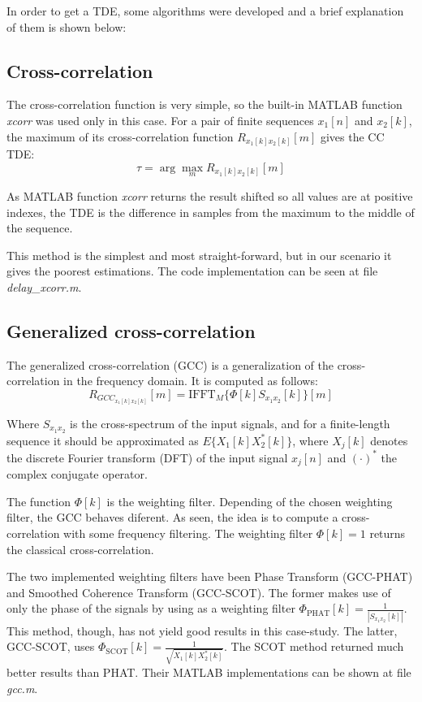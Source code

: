 In order to get a TDE, some algorithms were developed and a brief explanation of them is shown below:

\subsection{Cross-correlation}
  The cross-correlation function is very simple, so the built-in MATLAB function \emph{xcorr} was used only in this case. For a pair of finite sequences $x_1[n]$ and $x_2[k]$, the maximum of its cross-correlation function $R_{x_1[k] x_2[k]}[m]$ gives the CC TDE:
  $$ \tau = \arg\max_m R_{x_1[k] x_2[k]}[m] $$
  
  As MATLAB function \emph{xcorr} returns the result shifted so all values are at positive indexes, the TDE is the difference in samples from the maximum to the middle of the sequence.
  
  This method is the simplest and most straight-forward, but in our scenario it gives the poorest estimations. The code implementation can be seen at file \emph{delay\_xcorr.m}\cite{delayxcorr}.
  

\subsection{Generalized cross-correlation}
The generalized cross-correlation (GCC) is a generalization of the cross-correlation in the frequency domain. It is computed as follows:
$$R_{GCC_{x_1[k] x_2[k]}}[m] = \text{IFFT}_M\{\Phi[k]S_{x_1x_2}[k]\}[m]$$

Where $S_{x_1x_2}$ is the cross-spectrum of the input signals, and for a finite-length sequence it should be approximated as $E\{X_1[k]X^*_2[k]\} $, where $X_j[k]$ denotes the discrete Fourier transform (DFT) of the input signal $x_j[n]$ and $(\cdotp)^*$ the complex conjugate operator.

The function $\Phi[k]$ is the weighting filter. Depending of the chosen weighting filter, the GCC behaves diferent. As seen, the idea is to compute a cross-correlation with some frequency filtering. The weighting filter $\Phi[k]=1$ returns the classical cross-correlation.

The two implemented weighting filters have been Phase Transform (GCC-PHAT) and Smoothed Coherence Transform (GCC-SCOT). The former makes use of only the phase of the signals by using as a weighting filter $\Phi_{\text{PHAT}}[k]=\frac{1}{|S_{x_1x_2}[k]|}$. This method, though, has not yield good results in this case-study. The latter, GCC-SCOT, uses $\Phi_{\text{SCOT}}[k]=\frac{1}{\sqrt{X_1[k]X^*_2[k]}}$. The SCOT method returned much better results than PHAT. Their MATLAB implementations can be shown at file \emph{gcc.m}\cite{gcc}.

